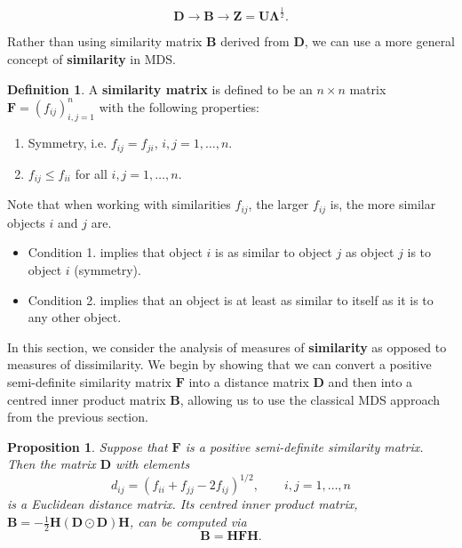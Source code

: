 \documentclass[]{book}
\providecommand{\tightlist}{%
  \setlength{\itemsep}{0pt}\setlength{\parskip}{0pt}}
\newtheorem{proposition}{Proposition}[chapter]
\theoremstyle{definition}
\newtheorem{definition}{Definition}[chapter]
\theoremstyle{definition}
\theoremstyle{definition}
\theoremstyle{remark}
\begin{document}
\[\mathbf D\longrightarrow \mathbf B\longrightarrow \mathbf Z=\mathbf U\boldsymbol \Lambda^{\frac{1}{2}}.\]

Rather than using similarity matrix \(\mathbf B\) derived from \(\mathbf D\), we can use a more general concept of \textbf{similarity} in MDS.

\begin{definition}
\protect\hypertarget{def:unnamed-chunk-21}{}{\label{def:unnamed-chunk-21} }A \textbf{similarity matrix} is defined to be an \(n \times n\) matrix \({\mathbf F}=(f_{ij})_{i,j=1}^n\) with the following properties:

\begin{enumerate}
\def\labelenumi{\arabic{enumi}.}
\tightlist
\item
  Symmetry, i.e. \(f_{ij} =f_{ji}\), \(i,j=1, \ldots , n\).
\item
  \(f_{ij} \leq f_{ii}\) for all \(i,j=1, \ldots , n\).
\end{enumerate}
\end{definition}

Note that when working with similarities \(f_{ij}\), the larger \(f_{ij}\) is, the more similar objects \(i\) and \(j\) are.

\begin{itemize}
\item
  Condition 1. implies that object \(i\) is as similar to object \(j\) as object \(j\) is to object \(i\) (symmetry).
\item
  Condition 2. implies that an object is at least as similar to itself as it is to any other object.
\end{itemize}

In this section, we consider the analysis of measures of \textbf{similarity} as opposed to measures of dissimilarity. We begin by showing that we can convert a positive semi-definite similarity matrix \(\mathbf F\) into a distance matrix \(\mathbf D\) and then into a centred inner product matrix \(\mathbf B\), allowing us to use the classical MDS approach from the previous section.

\begin{proposition}
\protect\hypertarget{prp:mds2}{}{\label{prp:mds2} }Suppose that \(\mathbf F\) is a positive semi-definite similarity matrix. Then the matrix \(\mathbf D\) with elements
\begin{equation}
d_{ij}=\left ( f_{ii}+f_{jj} -2f_{ij} \right )^{1/2}, \qquad i,j=1, \ldots , n
\label{eq:defD}
\end{equation}
is a Euclidean distance matrix. Its centred inner product matrix, \(\mathbf B= -\frac{1}{2}\mathbf H(\mathbf D\odot\mathbf D)\mathbf H\), can be computed via
\begin{equation}
\mathbf B=\mathbf H\mathbf F\mathbf H.
\label{eq:BHFH}
\end{equation}
\end{proposition}
\end{document}
